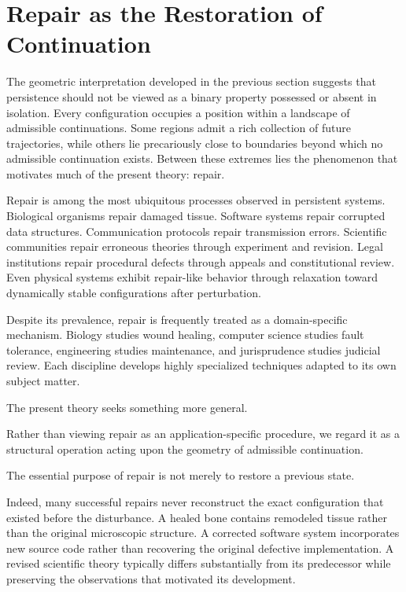 \documentclass[11pt]{book}
\numberwithin{equation}{chapter}
\theoremstyle{definition}
\theoremstyle{plain}
\begin{document}
\section{Repair as the Restoration of Continuation}

The geometric interpretation developed in the previous section suggests that persistence should not be viewed as a binary property possessed or absent in isolation. Every configuration occupies a position within a landscape of admissible continuations. Some regions admit a rich collection of future trajectories, while others lie precariously close to boundaries beyond which no admissible continuation exists. Between these extremes lies the phenomenon that motivates much of the present theory: repair.

Repair is among the most ubiquitous processes observed in persistent systems. Biological organisms repair damaged tissue. Software systems repair corrupted data structures. Communication protocols repair transmission errors. Scientific communities repair erroneous theories through experiment and revision. Legal institutions repair procedural defects through appeals and constitutional review. Even physical systems exhibit repair-like behavior through relaxation toward dynamically stable configurations after perturbation.

Despite its prevalence, repair is frequently treated as a domain-specific mechanism. Biology studies wound healing, computer science studies fault tolerance, engineering studies maintenance, and jurisprudence studies judicial review. Each discipline develops highly specialized techniques adapted to its own subject matter.

The present theory seeks something more general.

Rather than viewing repair as an application-specific procedure, we regard it as a structural operation acting upon the geometry of admissible continuation.

The essential purpose of repair is not merely to restore a previous state.

Indeed, many successful repairs never reconstruct the exact configuration that existed before the disturbance. A healed bone contains remodeled tissue rather than the original microscopic structure. A corrected software system incorporates new source code rather than recovering the original defective implementation. A revised scientific theory typically differs substantially from its predecessor while preserving the observations that motivated its development.
\end{document}
